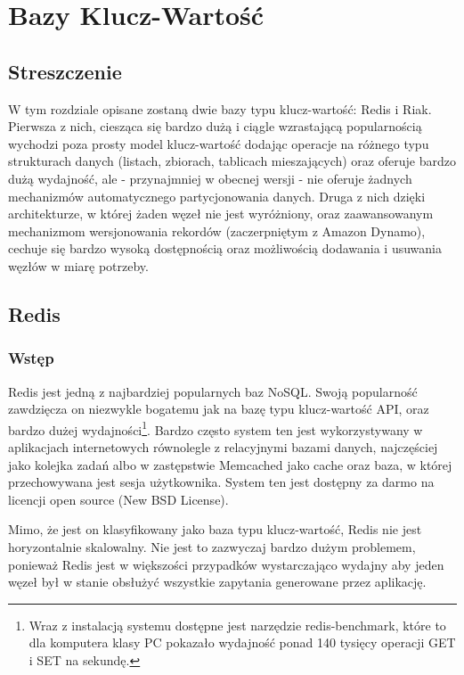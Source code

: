 \chapter{Bazy Klucz-Wartość}

\section*{Streszczenie}
W tym rozdziale opisane zostaną dwie bazy typu klucz-wartość: Redis i Riak.
Pierwsza z nich, ciesząca się bardzo dużą i ciągle wzrastającą popularnością wychodzi poza prosty model klucz-wartość dodając operacje na różnego typu strukturach danych (listach, zbiorach, tablicach mieszających) oraz oferuje bardzo dużą wydajność, ale - przynajmniej w obecnej wersji - nie oferuje żadnych mechanizmów automatycznego partycjonowania danych.
Druga z nich dzięki architekturze, w której żaden węzeł nie jest wyróżniony, oraz zaawansowanym mechanizmom wersjonowania rekordów (zaczerpniętym z Amazon Dynamo), cechuje się bardzo wysoką dostępnością oraz możliwością dodawania i usuwania węzłów w miarę potrzeby.

\section{Redis}
\label{sec:redis}

\subsection*{Wstęp} 

Redis jest jedną z najbardziej popularnych baz NoSQL.
Swoją popularność zawdzięcza on niezwykle bogatemu jak na bazę typu klucz-wartość API, oraz bardzo dużej wydajności\footnote{Wraz z instalacją systemu dostępne jest narzędzie redis-benchmark, które to dla komputera klasy PC pokazało wydajność ponad 140 tysięcy operacji GET i SET na sekundę.}.
Bardzo często system ten jest wykorzystywany w aplikacjach internetowych równolegle z relacyjnymi bazami danych, najczęściej jako kolejka zadań albo w zastępstwie Memcached jako cache oraz baza, w której przechowywana jest sesja użytkownika.
System ten jest dostępny za darmo na licencji open source (New BSD License).

Mimo, że jest on klasyfikowany jako baza typu klucz-wartość, Redis nie jest horyzontalnie skalowalny.
Nie jest to zazwyczaj bardzo dużym problemem, ponieważ Redis jest w większości przypadków wystarczająco wydajny aby jeden węzeł był w stanie obsłużyć wszystkie zapytania generowane przez aplikację.

